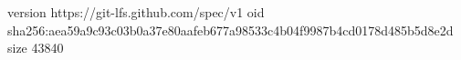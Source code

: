 version https://git-lfs.github.com/spec/v1
oid sha256:aea59a9c93c03b0a37e80aafeb677a98533c4b04f9987b4cd0178d485b5d8e2d
size 43840
